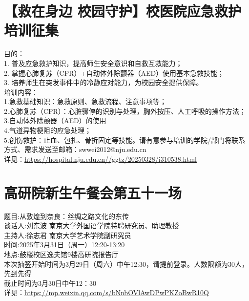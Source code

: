 \documentclass[letterpaper, 12pt]{article}
\begin{document}
\begin{multicols}{2}


\section{【救在身边 校园守护】校医院应急救护培训征集}
目的：
\\1. 普及应急救护知识，提高师生安全意识和自救互救能力；
\\2. 掌握心肺复苏（CPR）+自动体外除颤器（AED）使用基本急救技能；
\\3. 培养师生在突发事件中的冷静应对能力，为校园安全提供保障。
\\ 培训内容：
\\1.急救基础知识：急救原则、急救流程、注意事项等；
\\2.心肺复苏（CPR）：心脏骤停的识别与处理，胸外按压、人工呼吸的操作方法；
\\3.自动体外除颤器（AED）的使用
\\4.气道异物梗阻的应急处理；
\\5.创伤救护：止血、包扎、骨折固定等技能。请有意参与培训的学院/部门将联系方式、需求发送至邮箱：swwei2012@nju.edu.cn
\\详见：\url{https://hospital.nju.edu.cn//ggtz/20250328/i310538.html}
\section{高研院新生午餐会第五十一场}
题目:从敦煌到奈良：丝绸之路文化的东传
\\谈话人:刘东波 南京大学外国语学院特聘研究员、助理教授
\\主持人:徐志君 南京大学艺术学院副研究员
\\时间:2025年3月31日（周一）12:20-13:20
\\地点:鼓楼校区逸夫馆9楼高研院报告厅
\\本次抽签开始时间为3月29日（周六）中午12:30，请提前登录。人数限额为30人，先到先得
\\截止时间为3月30日中午12：30
\\详见：\url{https://mp.weixin.qq.com/s/bNnbOVlAwDPwPKZoBwR10Q}

\end{multicols}
\end{document}
